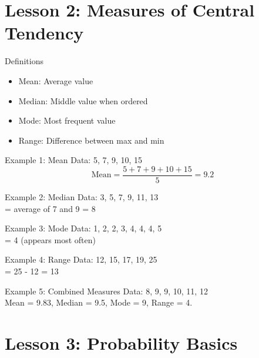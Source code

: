 \documentclass{beamer}
\begin{document}

\section{Lesson 2: Measures of Central Tendency}

\begin{frame}{Definitions}
\begin{itemize}
  \item Mean: Average value
  \item Median: Middle value when ordered
  \item Mode: Most frequent value
  \item Range: Difference between max and min
\end{itemize}
\end{frame}

\begin{frame}{Example 1: Mean}
Data: 5, 7, 9, 10, 15
\\
\[
\text{Mean} = \frac{5+7+9+10+15}{5} = 9.2
\]
\end{frame}

\begin{frame}{Example 2: Median}
Data: 3, 5, 7, 9, 11, 13
\\
 = average of 7 and 9 = 8
\end{frame}

\begin{frame}{Example 3: Mode}
Data: 1, 2, 2, 3, 4, 4, 4, 5
\\
 = 4 (appears most often)
\end{frame}

\begin{frame}{Example 4: Range}
Data: 12, 15, 17, 19, 25
\\
 = 25 - 12 = 13
\end{frame}

\begin{frame}{Example 5: Combined Measures}
Data: 8, 9, 9, 10, 11, 12
\\
Mean = 9.83, Median = 9.5, Mode = 9, Range = 4.
\end{frame}


\section{Lesson 3: Probability Basics}
\end{document}
